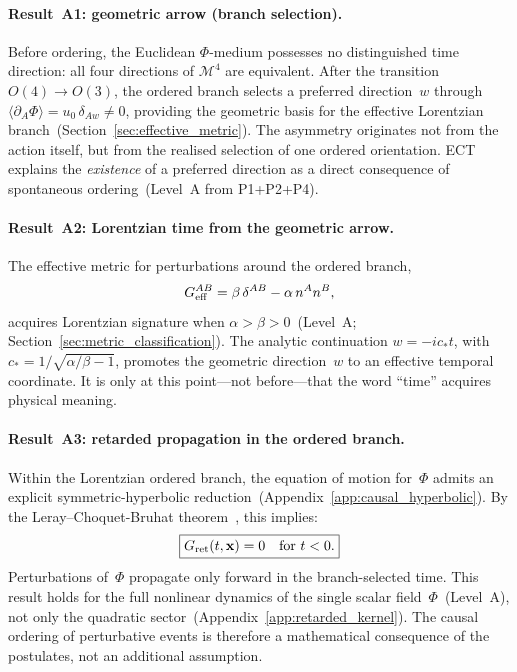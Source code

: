 \documentclass[11pt,a4paper]{article}
\numberwithin{equation}{section}
\begin{document}
\paragraph{Result~A1: geometric arrow (branch selection).}
Before ordering, the Euclidean $\Phi$-medium possesses no distinguished
time direction: all four directions of $\mathcal{M}^4$ are equivalent.
After the transition $O(4)\to O(3)$, the ordered branch selects a
preferred direction~$w$ through
$\langle \partial_A \Phi \rangle = u_0\,\delta_{Aw} \neq 0$,
providing the geometric basis for the effective Lorentzian
branch~(Section~\ref{sec:effective_metric}).
The asymmetry originates not from the action itself, but from
the realised selection of one ordered orientation.
ECT explains the \emph{existence} of a preferred
direction as a direct consequence of spontaneous
ordering~(Level~A from P1+P2+P4).

\paragraph{Result~A2: Lorentzian time from the geometric arrow.}
The effective metric for perturbations around the ordered branch,
\begin{equation}
  G^{AB}_{\rm eff} = \beta\,\delta^{AB} - \alpha\,n^A n^B,
  \label{eq:Geff_arrow}
\end{equation}
acquires Lorentzian signature when $\alpha>\beta>0$~(Level~A;
Section~\ref{sec:metric_classification}).
The analytic continuation $w = -ic_* t$, with
$c_* = 1/\sqrt{\alpha/\beta-1}$, promotes the geometric direction~$w$
to an effective temporal coordinate.
It is only at this point---not before---that the word ``time'' acquires
physical meaning.

\paragraph{Result~A3: retarded propagation in the ordered branch.}
Within the Lorentzian ordered branch, the equation of motion for~$\Phi$
admits an explicit symmetric-hyperbolic
reduction~(Appendix~\ref{app:causal_hyperbolic}).
By the Leray--Choquet-Bruhat
theorem~\cite{Leray1952,ChoquetBruhat1952}, this implies:
\begin{equation}
  \boxed{G_{\rm ret}(t,\mathbf{x}) = 0
  \quad\text{for } t<0.}
  \label{eq:retarded_arrow}
\end{equation}
Perturbations of~$\Phi$ propagate only forward in the
branch-selected time.
This result holds for the full nonlinear dynamics of the single
scalar field~$\Phi$~(Level~A), not only the quadratic
sector~(Appendix~\ref{app:retarded_kernel}).
The causal ordering of perturbative events is therefore a mathematical
consequence of the postulates, not an additional assumption.
\end{document}
